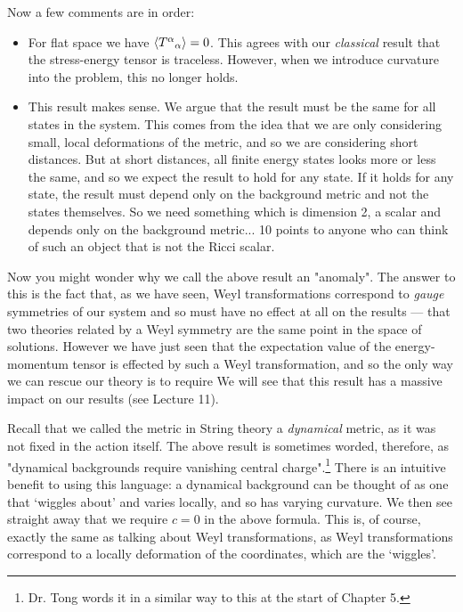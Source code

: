 Now a few comments are in order:
\begin{itemize}
    \item For flat space we have $\langle {T^{\alpha}}_{\alpha}\rangle = 0$. This agrees with our \textit{classical} result that the stress-energy tensor is traceless. However, when we introduce curvature into the problem, this no longer holds. 
    \item This result makes sense. We argue that the result must be the same for all states in the system. This comes from the idea that we are only considering small, local deformations of the metric, and so we are considering short distances. But at short distances, all finite energy states looks more or less the same, and so we expect the result to hold for any state. If it holds for any state, the result must depend only on the background metric and not the states themselves. So we need something which is dimension 2, a scalar and depends only on the background metric... 10 points to anyone who can think of such an object that is not the Ricci scalar. 
\end{itemize}

Now you might wonder why we call the above result an "anomaly". The answer to this is the fact that, as we have seen, Weyl transformations correspond to \textit{gauge} symmetries of our system and so must have no effect at all on the results --- that two theories related by a Weyl symmetry are the same point in the space of solutions. However we have just seen that the expectation value of the energy-momentum tensor is effected by such a Weyl transformation, and so the only way we can rescue our theory is to require 
We will see that this result has a massive impact on our results (see Lecture 11). 

\br 
    Recall that we called the metric in String theory a \textit{dynamical} metric, as it was not fixed in the action itself. The above result is sometimes worded, therefore, as "dynamical backgrounds require vanishing central charge".\footnote{Dr. Tong words it in a similar way to this at the start of Chapter 5.} There is an intuitive benefit to using this language: a dynamical background can be thought of as one that `wiggles about' and varies locally, and so has varying curvature. We then see straight away that we require $c=0$ in the above formula. This is, of course, exactly the same as talking about Weyl transformations, as Weyl transformations correspond to a locally deformation of the coordinates, which are the `wiggles'.
\er 

